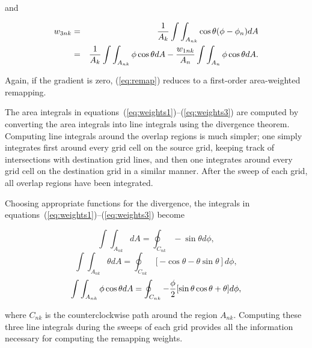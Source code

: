      and

\begin{eqnarray}\label{eq:weights3}
w_{3nk} & = & {1\over{A_k}}\int\int_{A_{nk}}\cos\theta(\phi-\phi_n)dA \nonumber \\
        & = & {1\over{A_k}}\int\int_{A_{nk}}\phi\cos\theta dA -
              {{w_{1nk}}\over{A_n}}\int\int_{A_n}\phi\cos\theta dA .
\end{eqnarray}

     Again, if the gradient is zero, ({\ref{eq:remap}}) reduces to a first-order
     area-weighted remapping. 

     The area integrals in equations~(\ref{eq:weights1})--(\ref{eq:weights3})
     are computed by converting the area integrals into line integrals using the
     divergence theorem.  Computing line integrals around the overlap regions
     is much simpler; one simply integrates first around every grid cell on the
     source grid, keeping track of intersections with destination grid lines,
     and then one integrates around every grid cell on the destination grid in
     a similar manner.  After the sweep of each grid, all overlap regions have
     been integrated.

     Choosing appropriate functions for the divergence, the integrals in
     equations~(\ref{eq:weights1})--(\ref{eq:weights3}) become

\begin{equation}
\int\int_{A_{nk}}dA = \oint_{C_{nk}} -\sin\theta d\phi,
\end{equation}
\begin{equation}
\int\int_{A_{nk}}\theta dA = 
 \oint_{C_{nk}} [-\cos\theta-\theta\sin\theta]d\phi,
\end{equation}
\begin{equation}
\int\int_{A_{nk}}\phi\cos\theta dA = 
\oint_{C_{nk}} -{\phi\over 2}[\sin\theta\cos\theta + \theta]d\phi,
\end{equation}

     where $C_{nk}$ is the counterclockwise path around the region $A_{nk}$.
     Computing these three line integrals during the sweeps of each grid
     provides all the information necessary for computing the remapping weights.

